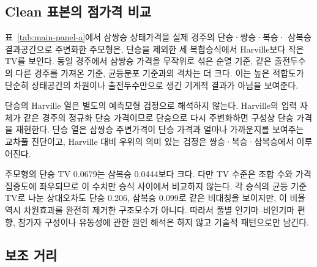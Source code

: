 \subsection{Clean 표본의 점가격 비교}

\begin{table}[htbp]
\centering
\caption{Panel A: 삼쌍승 주변가격과 실제 승식 가격의 거리}
\label{tab:main-panel-a}
\resizebox{\textwidth}{!}{}
\end{table}

표~\ref{tab:main-panel-a}에서 삼쌍승 상태가격을 실제 경주의 단승·쌍승·복승·
삼복승 결과공간으로 주변화한 주모형은, 단승을 제외한 세 복합승식에서
Harville보다 작은 TV를 보인다. 동일 경주에서 삼쌍승 가격을 무작위로 섞은
순열 기준, 같은 출전두수의 다른 경주를 가져온 기준, 균등분포 기준과의 격차는
더 크다. 이는 높은 적합도가 단순히 상태공간의 차원이나 출전두수만으로 생긴
기계적 결과가 아님을 보여준다.

단승의 Harville 열은 별도의 예측모형 검정으로 해석하지 않는다. Harville의
입력 자체가 같은 경주의 정규화 단승 가격이므로 단승으로 다시 주변화하면
구성상 단승 가격을 재현한다. 단승 열은 삼쌍승 주변가격이 단승 가격과 얼마나
가까운지를 보여주는 교차풀 진단이고, Harville 대비 우위의 의미 있는 검정은
쌍승·복승·삼복승에서 이루어진다.

주모형의 단승 TV 0.0679는 삼복승 0.0444보다 크다. 다만 TV 수준은 조합 수와
가격집중도에 좌우되므로 이 수치만 승식 사이에서 비교하지 않는다. 각 승식의
균등 기준 TV로 나눈 상대오차도 단승 0.206, 삼복승 0.099로 같은 비대칭을
보이지만, 이 비율 역시 차원효과를 완전히 제거한 구조모수가 아니다. 따라서
풀별 인기마--비인기마 편향, 참가자 구성이나 유동성에 관한 원인 해석은 하지
않고 기술적 패턴으로만 남긴다.

\subsection{보조 거리}

\begin{table}[htbp]
\centering
\caption{Panel A의 Harville 대비 보조 거리와 유사도. 모든 값은 경주별
통계의 중앙값이고 JS에는 경주 bootstrap 95\% 구간을 함께 제시한다.
CLR은 centered log-ratio 거리이며 작을수록 실제 풀 가격에 가깝다.
상관계수와 cosine은 크기오차를 제거한 분포형태 유사도이며 클수록 형태가
비슷하다는 뜻이다. 단승 Harville 행은 같은 단승가격을 입력과 목표로
쓰므로 구성상 항등식이다.}
\label{tab:main-panel-a-auxiliary}
\resizebox{\textwidth}{!}{}
\end{table}

